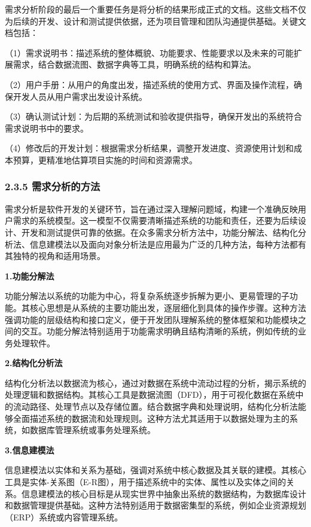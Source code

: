 需求分析阶段的最后一个重要任务是将分析的结果形成正式的文档。这些文档不仅为后续的开发、设计和测试提供依据，还为项目管理和团队沟通提供基础。关键文档包括：

（1）需求说明书：描述系统的整体概貌、功能要求、性能要求以及未来的可能扩展需求，结合数据流图、数据字典等工具，明确系统的结构和算法。

（2）用户手册：从用户的角度出发，描述系统的使用方式、界面及操作流程，确保开发人员从用户需求出发设计系统。

（3）确认测试计划：为后期的系统测试和验收提供指导，确保开发出的系统符合需求说明书中的要求。

（4）修改后的开发计划：根据需求分析结果，调整开发进度、资源使用计划和成本预算，更精准地估算项目实施的时间和资源需求。

\subsubsection{2.3.5 需求分析的方法}\label{ux9700ux6c42ux5206ux6790ux7684ux65b9ux6cd5}

需求分析是软件开发的关键环节，旨在通过深入理解问题域，构建一个准确反映用户需求的系统模型。这一模型不仅需要清晰描述系统的功能和责任，还要为后续设计、开发和测试提供可靠的依据。在众多需求分析方法中，功能分解法、结构化分析法、信息建模法以及面向对象分析法是应用最为广泛的几种方法，每种方法都有其独特的视角和适用场景。

\textbf{1.功能分解法}

功能分解法以系统的功能为中心，将复杂系统逐步拆解为更小、更易管理的子功能。其核心思想是从系统的主要功能出发，逐层细化到具体的操作步骤。这种方法强调功能的层级结构和接口定义，便于开发团队理解系统的整体框架和功能模块之间的交互。功能分解法特别适用于功能需求明确且结构清晰的系统，例如传统的业务处理软件。

\textbf{2.结构化分析法}

结构化分析法以数据流为核心，通过对数据在系统中流动过程的分析，揭示系统的处理逻辑和数据结构。其核心工具是数据流图（DFD），用于可视化数据在系统中的流动路径、处理节点以及存储位置。结合数据字典和处理说明，结构化分析法能够全面描述系统的数据流和处理规则。这种方法尤其适用于以数据处理为主的系统，如数据库管理系统或事务处理系统。

\textbf{3.信息建模法}

信息建模法以实体和关系为基础，强调对系统中核心数据及其关联的建模。其核心工具是实体-关系图（E-R图），用于描述系统中的实体、属性以及实体之间的关系。信息建模法的核心目标是从现实世界中抽象出系统的数据结构，为数据库设计和数据管理提供基础。这种方法特别适用于数据密集型的系统，例如企业资源规划（ERP）系统或内容管理系统。

